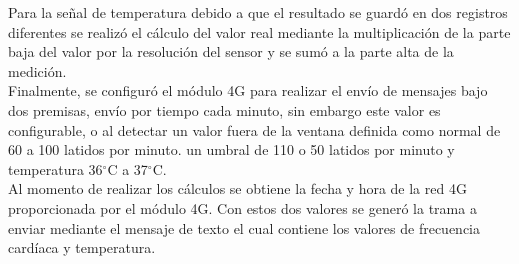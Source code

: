 Para la señal de temperatura debido a que el resultado se guardó en dos registros diferentes se realizó el cálculo del valor real mediante la multiplicación de la parte baja del valor por la resolución del sensor y se sumó a la parte alta de la medición.\\

Finalmente, se configuró el módulo 4G para realizar el envío de mensajes bajo dos premisas, envío por tiempo cada minuto, sin embargo este valor es configurable, o al detectar un valor fuera de la ventana definida como normal de 60 a 100 latidos por minuto. un umbral de 110 o 50  latidos por minuto y temperatura 36$^{\circ}$C a 37$^{\circ}$C.\\ 

Al momento de realizar los cálculos se obtiene la fecha y hora de la red 4G proporcionada por el módulo 4G. Con estos dos valores se generó la trama a enviar mediante el mensaje de texto el cual contiene los valores de frecuencia cardíaca y temperatura.


